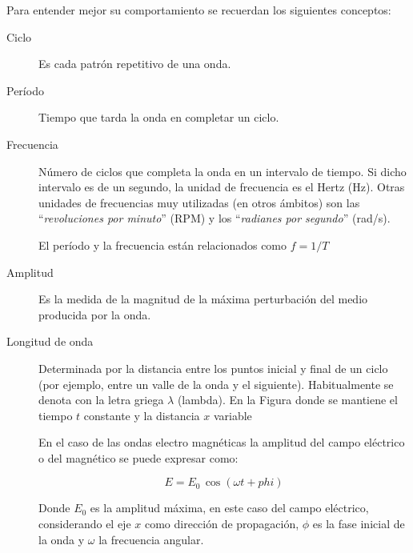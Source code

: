 





Para entender mejor su comportamiento se recuerdan los siguientes conceptos:

\begin{description}
\item [Ciclo] Es cada patr\'on repetitivo de una onda.

\item  [Per\'iodo] Tiempo que tarda la onda en completar un ciclo.

\item  [Frecuencia] N\'umero de ciclos que completa la onda en un intervalo de
  tiempo. Si dicho intervalo es de un segundo, la unidad de frecuencia
  es el Hertz (Hz). Otras unidades de frecuencias muy utilizadas (en
  otros \'ambitos) son las ``\textit{revoluciones por minuto}'' (RPM) y los
  ``\textit{radianes por segundo}'' (rad/s).

El per\'iodo y la frecuencia est\'an relacionados como $ f = 1/T $

\item [Amplitud] Es la medida de la magnitud de la m\'axima perturbaci\'on del medio producida por la onda.

\item [Longitud de onda] Determinada por la distancia entre los puntos inicial y final de un ciclo (por ejemplo, entre un valle de la onda y el siguiente). Habitualmente se denota con la letra griega $\lambda$ (lambda).
En la Figura
donde se mantiene el tiempo $t$ constante y la distancia $x$ variable 


En el caso de las ondas electro magn\'eticas 
la amplitud del campo el\'ectrico o del magn\'etico se puede expresar como:

\[ E = E_0 \,\cos{(     \omega t + phi)}
\]

Donde $E_0$ es la amplitud m\'axima, en este caso del campo el\'ectrico,  considerando el eje $x$
como direcci\'on de propagaci\'on, 
$\phi$ es la fase inicial
de la onda y $\omega$ la frecuencia angular.


\end{description}
